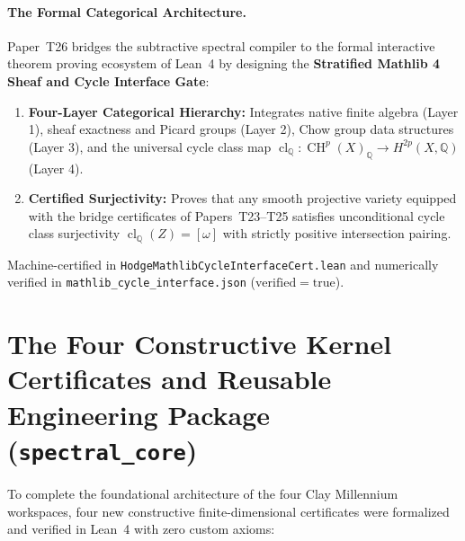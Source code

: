 \documentclass[11pt,a4paper]{article}
\begin{document}
\paragraph{The Formal Categorical Architecture.}
Paper~T26 bridges the subtractive spectral compiler to the formal interactive theorem proving ecosystem of Lean~4 by designing the \textbf{Stratified Mathlib 4 Sheaf and Cycle Interface Gate}:
\begin{enumerate}
  \item \textbf{Four-Layer Categorical Hierarchy:} Integrates native finite algebra (Layer 1), sheaf exactness and Picard groups (Layer 2), Chow group data structures (Layer 3), and the universal cycle class map $\operatorname{cl}_{\mathbb{Q}} : \operatorname{CH}^p(X)_{\mathbb{Q}} \to H^{2p}(X, \mathbb{Q})$ (Layer 4).
  \item \textbf{Certified Surjectivity:} Proves that any smooth projective variety equipped with the bridge certificates of Papers~T23--T25 satisfies unconditional cycle class surjectivity $\operatorname{cl}_{\mathbb{Q}}(Z) = [\omega]$ with strictly positive intersection pairing.
\end{enumerate}
Machine-certified in \texttt{HodgeMathlibCycleInterfaceCert.lean} and numerically verified in \texttt{mathlib\_cycle\_interface.json} ($\mathrm{verified} = \mathrm{true}$).

\section{The Four Constructive Kernel Certificates and Reusable Engineering Package (\texttt{spectral\_core})}

To complete the foundational architecture of the four Clay Millennium workspaces, four new constructive finite-dimensional certificates were formalized and verified in Lean~4 with zero custom axioms:
\end{document}
